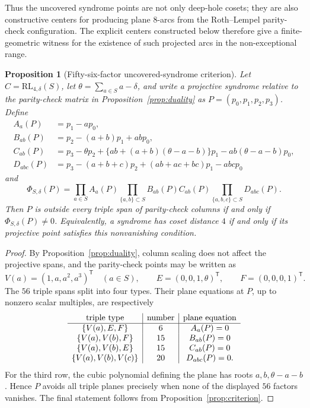 \documentclass[11pt]{article}
\newcommand{\RL}{\mathrm{RL}}
\theoremstyle{plain}
\newtheorem{proposition}{Proposition}
\theoremstyle{definition}
\begin{document}
Thus the uncovered syndrome points are not only deep-hole cosets; they are
also constructive centers for producing plane \(8\)-arcs from the
Roth--Lempel parity-check configuration.  The explicit centers constructed
below therefore give a finite-geometric witness for the existence of such
projected arcs in the non-exceptional range.

\begin{proposition}[Fifty-six-factor uncovered-syndrome criterion]
\label{prop:explicit-product}
Let \(C=\RL_{4,\delta}(S)\), let
\(\theta=\sum_{a\in S}a-\delta\), and write a projective syndrome relative
to the parity-check matrix in Proposition~\ref{prop:duality} as
\(P=(p_0,p_1,p_2,p_3)\).  Define
\[
\begin{aligned}
A_a(P)&=p_1-ap_0,\\
B_{ab}(P)&=p_2-(a+b)p_1+abp_0,\\
C_{ab}(P)&=p_3-\theta p_2+
 \{ab+(a+b)(\theta-a-b)\}p_1-ab(\theta-a-b)p_0,\\
D_{abc}(P)&=p_3-(a+b+c)p_2+(ab+ac+bc)p_1-abcp_0
\end{aligned}
\]
and
\[
 \Phi_{S,\delta}(P)=
 \prod_{a\in S}A_a(P)
 \prod_{\{a,b\}\subset S}B_{ab}(P)C_{ab}(P)
 \prod_{\{a,b,c\}\subset S}D_{abc}(P).
\]
Then \(P\) is outside every triple span of parity-check columns if and only
if \(\Phi_{S,\delta}(P)\ne0\).  Equivalently, a syndrome has coset distance
\(4\) if and only if its projective point satisfies this nonvanishing
condition.
\end{proposition}

\begin{proof}
By Proposition~\ref{prop:duality}, column scaling does not affect the
projective spans, and the parity-check points may be written as
\[
 V(a)=(1,a,a^2,a^3)^{\mathsf T}\quad(a\in S),\qquad
 E=(0,0,1,\theta)^{\mathsf T},\qquad F=(0,0,0,1)^{\mathsf T}.
\]
The \(56\) triple spans split into four types.  Their plane equations at
\(P\), up to nonzero scalar multiples, are respectively
\[
\begin{array}{c|c|c}
\hbox{triple type}&\hbox{number}&\hbox{plane equation}\\ \hline
\{V(a),E,F\}&6&A_a(P)=0\\
\{V(a),V(b),F\}&15&B_{ab}(P)=0\\
\{V(a),V(b),E\}&15&C_{ab}(P)=0\\
\{V(a),V(b),V(c)\}&20&D_{abc}(P)=0.
\end{array}
\]
For the third row, the cubic polynomial defining the plane has roots
\(a,b,\theta-a-b\).  Hence \(P\) avoids all triple planes precisely when
none of the displayed \(56\) factors vanishes.  The final statement follows
from Proposition~\ref{prop:criterion}.
\end{proof}
\end{document}
